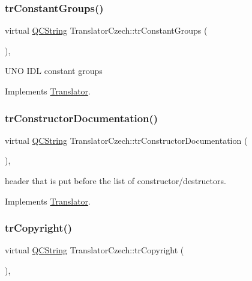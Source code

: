 \subsubsection{\texorpdfstring{trConstantGroups()}{trConstantGroups()}}
{\footnotesize\ttfamily virtual \mbox{\hyperlink{class_q_c_string}{Q\+C\+String}} Translator\+Czech\+::tr\+Constant\+Groups (\begin{DoxyParamCaption}{ }\end{DoxyParamCaption})\hspace{0.3cm}{\ttfamily [inline]}, {\ttfamily [virtual]}}

U\+NO I\+DL constant groups 

Implements \mbox{\hyperlink{class_translator}{Translator}}.

\mbox{\label{class_translator_czech_ac60c33613730ea0fd182a8ee10788bed}} 
\subsubsection{\texorpdfstring{trConstructorDocumentation()}{trConstructorDocumentation()}}
{\footnotesize\ttfamily virtual \mbox{\hyperlink{class_q_c_string}{Q\+C\+String}} Translator\+Czech\+::tr\+Constructor\+Documentation (\begin{DoxyParamCaption}{ }\end{DoxyParamCaption})\hspace{0.3cm}{\ttfamily [inline]}, {\ttfamily [virtual]}}

header that is put before the list of constructor/destructors. 

Implements \mbox{\hyperlink{class_translator}{Translator}}.

\mbox{\label{class_translator_czech_a4ea7a83c65de11eef9640547fce14822}} 
\subsubsection{\texorpdfstring{trCopyright()}{trCopyright()}}
{\footnotesize\ttfamily virtual \mbox{\hyperlink{class_q_c_string}{Q\+C\+String}} Translator\+Czech\+::tr\+Copyright (\begin{DoxyParamCaption}{ }\end{DoxyParamCaption})\hspace{0.3cm}{\ttfamily [inline]}, {\ttfamily [virtual]}}

